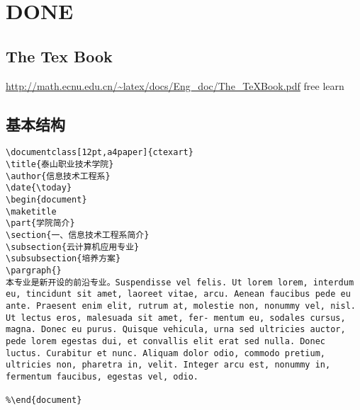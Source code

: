\documentclass[11pt]{ctexart}
\begin{document}
\section{{\bfseries\sffamily DONE} \latex}
\label{sec:org4b05dae}
\subsection{The Tex Book}
\label{sec:orgd2b7dd5}
\url{http://math.ecnu.edu.cn/\~latex/docs/Eng\_doc/The\_TeXBook.pdf}
free learn
\subsection{基本结构}
\label{sec:orgffa90b7}
\lstset{language=org,label= ,caption= ,captionpos=b,numbers=none}
\begin{lstlisting}
\documentclass[12pt,a4paper]{ctexart}
\title{泰山职业技术学院}
\author{信息技术工程系}
\date{\today}
\begin{document}
\maketitle
\part{学院简介}
\section{一、信息技术工程系简介}
\subsection{云计算机应用专业}
\subsubsection{培养方案}
\pargraph{}
本专业是新开设的前沿专业。Suspendisse vel felis. Ut lorem lorem, interdum eu, tincidunt sit amet, laoreet vitae, arcu. Aenean faucibus pede eu ante. Praesent enim elit, rutrum at, molestie non, nonummy vel, nisl. Ut lectus eros, malesuada sit amet, fer- mentum eu, sodales cursus, magna. Donec eu purus. Quisque vehicula, urna sed ultricies auctor, pede lorem egestas dui, et convallis elit erat sed nulla. Donec luctus. Curabitur et nunc. Aliquam dolor odio, commodo pretium, ultricies non, pharetra in, velit. Integer arcu est, nonummy in, fermentum faucibus, egestas vel, odio.

%\end{document}
\end{lstlisting}
\end{document}
